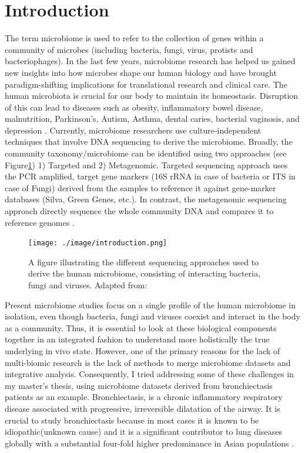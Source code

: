 \section*{Introduction}

The term microbiome is used to refer to the collection of genes within a community of microbes (including bacteria, fungi, virus, protists and bacteriophages). In the last few years, microbiome research has helped us gained new insights into how microbes shape our human biology and have brought paradigm-shifting implications for translational research and clinical care. The human microbiota is crucial for our body to maintain its homeostasis. Disruption of this can lead to diseases such as obesity, inflammatory bowel disease, malnutrition, Parkinson's, Autism, Asthma, dental caries, bacterial vaginosis, and depression \cite{Knight2017}.  Currently, microbiome researchers use culture-independent techniques that involve DNA sequencing to derive the microbiome. Broadly, the community taxonomy/microbiome can be identified using two approaches (see Figure\ref{fig1}) 1) Targeted and 2) Metagenomic. Targeted sequencing approach uses the PCR amplified, target gene markers (16S rRNA in case of bacteria or ITS in case of Fungi) derived from the samples to reference it against gene-marker databases (Silva, Green Genes, etc.). In contrast, the metagenomic sequencing approach directly sequence the whole community DNA and compares it to reference genomes \cite{Morgan2012}.

\begin{figure}[ht]
	\centering
	\texttt{[image: ./image/introduction.png]}
	\caption{A figure illustrating the different sequencing approaches used to derive the human microbiome, consisting of interacting bacteria, fungi and viruses. Adapted from: \cite{Morgan2012}}
	\label{fig1}
\end{figure}

Present microbiome studies focus on a single profile of the human microbiome in isolation, even though bacteria, fungi and viruses coexist and interact in the body as a community. Thus, it is essential to look at these biological components together in an integrated fashion to understand more holistically the true underlying in vivo state. However, one of the primary reasons for the lack of multi-biomic research is the lack of methods to merge microbiome datasets and integrative analysis. Consequently, I tried addressing some of these challenges in my master's thesis, using microbiome datasets derived from bronchiectasis patients as an example. Bronchiectasis, is a chronic inflammatory respiratory disease associated with progressive, irreversible dilatation of the airway. It is crucial to study bronchiectasis because in most cases it is known to be idiopathic(unknown cause) \cite{pmid29478908} and it is a significant contributor to lung diseases globally with a substantial four-fold higher predominance in Asian populations \cite{Seitz2012}. 

